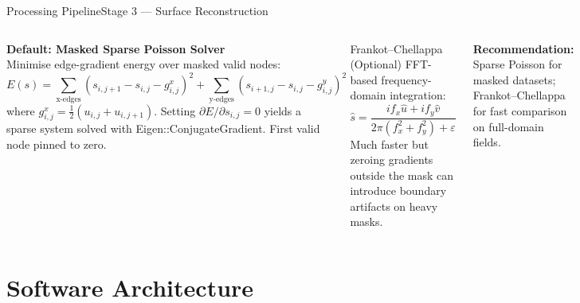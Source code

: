 \documentclass[9pt, aspectratio=169]{beamer}
\newcommand{\code}[1]{{\ttfamily\color{accent!85!black}#1}}
\begin{document}
\begin{frame}{Processing Pipeline}{Stage 3 --- Surface Reconstruction}
  \begin{columns}[t]
    \begin{minipage}[t][\columnheight][t]{\linewidth}
    \vspace{0.8cm}
      \textbf{Default: Masked Sparse Poisson Solver}\\[0.2em]
      Minimise edge-gradient energy over masked valid nodes:
      \[
        E(s) = \!\!\sum_{\text{x-edges}}\!\!\left(s_{i,j+1} - s_{i,j} - g^x_{i,j}\right)^2
              \!+\!\!\sum_{\text{y-edges}}\!\!\left(s_{i+1,j} - s_{i,j} - g^y_{i,j}\right)^2
      \]
      \small where $g^x_{i,j} = \tfrac{1}{2}(u_{i,j}+u_{i,j+1})$.
      Setting $\partial E/\partial s_{i,j}=0$ yields a sparse system solved with \code{Eigen::ConjugateGradient}. First valid node pinned to zero.
    \end{minipage}
      \begin{block}{Frankot--Chellappa (Optional)}
        FFT-based frequency-domain integration:
        \[
          \hat{s} =
          \frac{if_x\hat{u} + if_y\hat{v}}{2\pi(f_x^2+f_y^2)+\varepsilon}
        \]
        Much faster but zeroing gradients outside the mask can introduce boundary artifacts on heavy masks.
      \end{block}
      \vspace{0.3em}
      \small \textbf{Recommendation:} Sparse Poisson for masked datasets; Frankot--Chellappa for fast comparison on full-domain fields.
  \end{columns}
\end{frame}

\section{Software Architecture}
\end{document}
